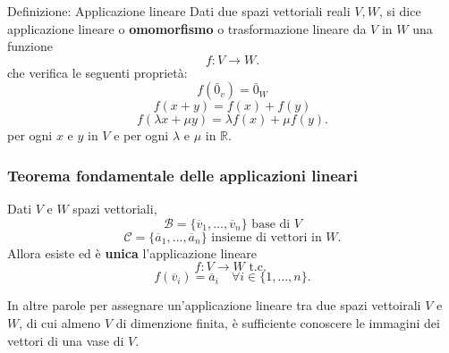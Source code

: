 \documentclass[x11names]{article}
\begin{document}
\begin{center}
\colorbox{myblue}{\begin{minipage}{5.75in}
\begin{blues}{Definizione: Applicazione lineare}
	Dati due spazi vettoriali reali $V,W$, si dice applicazione lineare o \textbf{omomorfismo} o trasformazione lineare da $V$ in  $W$ una funzione
\[
f: V \longrightarrow W 
.\] 
che verifica le seguenti proprietà:
\[
f\left(\bar{0}_{v}\right) = \bar{0}_{W}
\] 
\[
f\left(x+y\right) = f\left(x\right) + f\left(y\right)
\] 
\[
f\left(\lambda x + \mu y\right) = \lambda f\left(x\right) + \mu f\left(y\right) 
.\] 
per ogni $x$ e  $y$ in $V$ e per ogni $\lambda$ e $\mu$ in $\mathbb{R}$.
\end{blues}
\end{minipage}}        
\end{center}
\begin{center}
	\colorbox{myred}{\begin{minipage}{5.75in}
			\begin{redes}{}
				\subsubsection{Teorema fondamentale delle applicazioni lineari}
				Dati $V$ e  $W$ spazi vettoriali,
				\[
				\mathscr{B} = \{\overline{v}_{1},\dots,\overline{v}_{n}\} \text{ base di }V
				\] 
				\[
				\mathscr{C} = \{\overline{a}_{1},\dots,\overline{a}_{n}\} \text{ insieme di vettori in }W
				.\] 
				Allora esiste ed è \textbf{unica} l'applicazione lineare
				\[
				f: V \longrightarrow W \text{ t.c. }
				\] 
				\[
				f\left(\overline{v}_{i}\right) = \overline{a}_{i} \quad \forall i \in \{1,\dots,n\}
				.\] 
			\end{redes}
	\end{minipage}}        
\end{center}

In altre parole per assegnare un'applicazione lineare tra due spazi vettoirali $V$ e $W$, di cui almeno $V$ di dimenzione finita, è sufficiente conoscere le immagini dei vettori di una vase di $V$.
\end{document}
